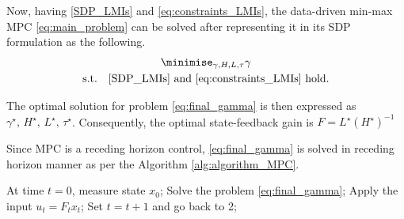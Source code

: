Now, having \eqref{SDP_LMIs} and \eqref{eq:constraints_LMIs}, the data-driven min-max MPC \eqref{eq:main_problem} can be solved after representing it in its SDP formulation as the following.
\begin{subequations}
	\begin{gather}
		\minimise_{\gamma, H, L, \tau} \gamma \\
		\text{s.t.} \quad \eqref{SDP_LMIs} \text{ and } \eqref{eq:constraints_LMIs} \text{ hold.}
	\end{gather}
\end{subequations}

The optimal solution for problem \eqref{eq:final_gamma} is then expressed as $\gamma^\star, \, H^\star, \, L^\star, \, \tau^\star$. Consequently, the optimal state-feedback gain is $F = L^\star (H^\star)^{-1}$

Since MPC is a receding horizon control, \eqref{eq:final_gamma} is solved in receding horizon manner as per the Algorithm \ref{alg:algorithm_MPC}.

\begin{algorithm}
	\caption{Data-driven min-max MPC}
	\begin{algorithmic}[1]
		\STATE At time $t = 0$, measure state $x_0$;
		\STATE Solve the problem \eqref{eq:final_gamma};
		\STATE Apply the input $u_t = F_t x_t$;
		\STATE Set $t = t + 1$ and go back to 2;
	\end{algorithmic}

\end{algorithm}

%



